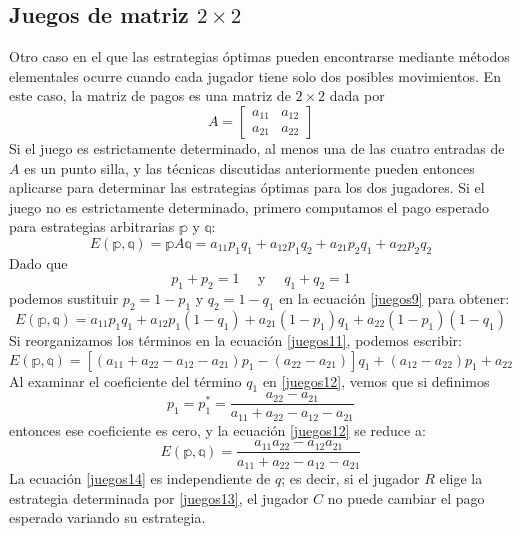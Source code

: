 \subsection*{Juegos de matriz {\boldmath$2 \times 2$}}

Otro caso en el que las estrategias óptimas pueden encontrarse mediante métodos elementales ocurre cuando cada jugador tiene solo dos posibles movimientos. En este caso, la matriz de pagos es una matriz de $2 \times 2$ dada por
$$A = \begin{bmatrix}
    a_{11} & a_{12} \\
    a_{21} & a_{22}
\end{bmatrix}$$
Si el juego es estrictamente determinado, al menos una de las cuatro entradas de $A$ es un punto silla, y las técnicas discutidas anteriormente pueden entonces aplicarse para determinar las estrategias óptimas para los dos jugadores. Si el juego no es estrictamente determinado, primero computamos el pago esperado para estrategias arbitrarias $\mathbb{p}$ y $\mathbb{q}$:
\begin{equation}
    E(\mathbb{p}, \mathbb{q}) = \mathbb{p} A \mathbb{q} = a_{11}p_1q_1 + a_{12}p_1q_2 + a_{21}p_2q_1 + a_{22}p_2q_2 \label{juegos9}
\end{equation}
Dado que
\begin{equation}
    p_1 + p_2 = 1 \quad \text{ y } \quad q_1 + q_2 = 1 \label{juegos10}
\end{equation}
podemos sustituir $p_2 = 1 - p_1$ y $q_2 = 1 - q_1$ en la ecuación \eqref{juegos9} para obtener:
\begin{equation}
    E(\mathbb{p}, \mathbb{q}) = a_{11}p_1q_1 + a_{12}p_1(1 - q_1) + a_{21}(1 - p_1)q_1 + a_{22}(1 - p_1)(1 - q_1) \label{juegos11}
\end{equation}\newpage\noindent
Si reorganizamos los términos en la ecuación \eqref{juegos11}, podemos escribir:
\begin{equation}
    E(\mathbb{p}, \mathbb{q}) = [(a_{11} + a_{22} - a_{12} - a_{21})p_1 - (a_{22} - a_{21})]q_1 + (a_{12} - a_{22})p_1 + a_{22} \label{juegos12}
\end{equation}
Al examinar el coeficiente del término $q_1$ en \eqref{juegos12}, vemos que si definimos
\begin{equation}
    p_1 = p_1^* = \frac{a_{22} - a_{21}}{a_{11} + a_{22} - a_{12} - a_{21}} \label{juegos13}
\end{equation}
entonces ese coeficiente es cero, y la ecuación \eqref{juegos12} se reduce a:
\begin{equation}
    E(\mathbb{p}, \mathbb{q}) = \frac{a_{11}a_{22} - a_{12}a_{21}}{a_{11} + a_{22} - a_{12} - a_{21}} \label{juegos14}
\end{equation}
La ecuación \eqref{juegos14} es independiente de $q$; es decir, si el jugador $R$ elige la estrategia determinada por \eqref{juegos13}, el jugador $C$ no puede cambiar el pago esperado variando su estrategia.

